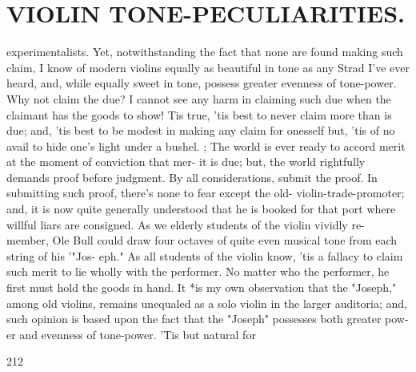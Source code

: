 \documentclass{article}
\begin{document}
\section*{VIOLIN TONE-PECULIARITIES.}
experimentalists. Yet, notwithstanding the fact that none are found making such claim, I know of modern violins equally as beautiful in tone as any Strad I've ever heard, and, while equally sweet in tone, possess greater evenness of tone-power. Why not claim the due? I cannot see any harm in claiming such due when the claimant has the goods to show! Tis true, 'tis best to never claim more than is due; and, 'tis best to be modest in making any claim for onesself but, 'tis of no avail to hide one's light under a bushel. ; The world is ever ready to accord merit at the moment of conviction that mer- it is due; but, the world rightfully demands proof before judgment. By all considerations, submit the proof. In submitting such proof, there's none to fear except the old- violin-trade-promoter; and, it is now quite generally understood that he is booked for that port where willful liars are consigned. As we elderly students of the violin vividly re- member, Ole Bull could draw four octaves of quite even musical tone from each string of his '"Jos- eph." As all students of the violin know, 'tis a fallacy to claim such merit to lie wholly with the performer. No matter who the performer, he first must hold the goods in hand. It *is my own observation that the "Joseph," among old violins, remains unequaled as a solo violin in the larger auditoria; and, such opinion is based upon the fact that the "Joseph" possesses both greater pow- er and evenness of tone-power. 'Tis but natural for

212
\end{document}
